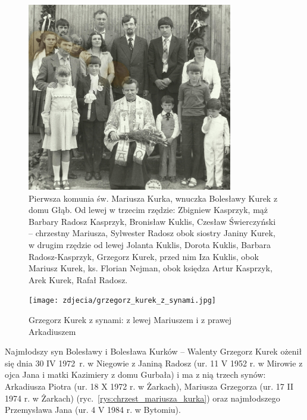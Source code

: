 \begin{figure}[!h]
\begin{center}
\includegraphics[width=0.8\textwidth]{zdjecia/pierwsza_komunia_mariusza_kurka.jpg}
\caption[Pierwsza komunia św. Mariusza Kurka]{Pierwsza komunia św. Mariusza Kurka, wnuczka Bolesławy Kurek z domu Głąb. Od lewej w trzecim rzędzie: Zbigniew Kasprzyk, mąż Barbary Radosz Kasprzyk, Bronisław Kuklis, Czesław Świerczyński -- chrzestny Mariusza, Sylwester Radosz obok siostry Janiny Kurek, w drugim rzędzie od lewej Jolanta Kuklis, Dorota Kuklis, Barbara Radosz-Kasprzyk, Grzegorz Kurek, przed nim Iza Kuklis, obok Mariusz Kurek, ks. Florian Nejman, obok księdza Artur Kasprzyk, Arek Kurek, Rafał Radosz.}
\label{rys:pierwsza_komunia_mariusza_kurka}
\end{center}
\end{figure}

\begin{figure}[!h]
\begin{center}
\texttt{[image: zdjecia/grzegorz\_kurek\_z\_synami.jpg]}
\caption[Grzegorz Kurek z synami]{Grzegorz Kurek z synami: z lewej Mariuszem i z prawej Arkadiuszem}
\label{rys:grzegorz_kurek_z_synami}
\end{center}
\end{figure}

Najmłodszy syn Bolesławy i Bolesława Kurków -- Walenty Grzegorz Kurek ożenił się dnia 30 IV 1972~r. w Niegowie z Janiną Radosz (ur. 11 V 1952 r. w Mirowie z ojca Jana i matki Kazimiery z domu Gurbała) i ma z nią trzech synów: Arkadiusza Piotra (ur. 18 X 1972 r. w Żarkach), Mariusza Grzegorza (ur. 17 II 1974 r. w Żarkach) (ryc.~\ref{rys:chrzest_mariusza_kurka}) oraz najmłodszego Przemysława Jana (ur. 4 V 1984 r. w Bytomiu).


